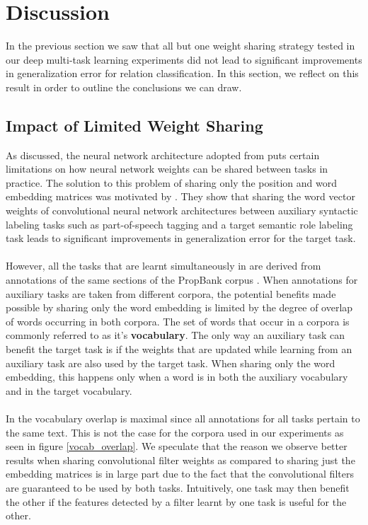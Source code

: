 \chapter{Discussion}
In the previous section we saw that all but one weight sharing strategy tested in our deep multi-task learning experiments did not lead to significant improvements in generalization error for relation classification. In this section, we reflect on this result in order to outline the conclusions we can draw.

\section{Impact of Limited Weight Sharing}
As discussed, the neural network architecture adopted from \citet{nguyen2015} puts certain limitations on how neural network weights can be shared between tasks in practice. The solution to this problem of sharing only the position and word embedding matrices was motivated by \citet{collobert2008}. They show that sharing the word vector weights of convolutional neural network architectures between auxiliary syntactic labeling tasks such as part-of-speech tagging and a target semantic role labeling task leads to significant improvements in generalization error for the target task.
\\\\
However, all the tasks that are learnt simultaneously in \citet{collobert2008} are derived from annotations of the same sections of the PropBank corpus \citep{kingsbury2002}. When annotations for auxiliary tasks are taken from different corpora, the potential benefits made possible by sharing only the word embedding is limited by the degree of overlap of words occurring in both corpora. The set of words that occur in a corpora is commonly referred to as it's \textbf{vocabulary}. The only way an auxiliary task can benefit the target task is if the weights that are updated while learning from an auxiliary task are also used by the target task. When sharing only the word embedding, this happens only when a word is in both the auxiliary vocabulary and in the target vocabulary.
\\\\
In \citet{collobert2008} the vocabulary overlap is maximal since all annotations for all tasks pertain to the same text. This is not the case for the corpora used in our experiments as seen in figure \ref{vocab_overlap}. We speculate that the reason we observe better results when sharing convolutional filter weights as compared to sharing just the embedding matrices is in large part due to the fact that the convolutional filters are guaranteed to be used by both tasks. Intuitively, one task may then benefit the other if the features detected by a filter learnt by one task is useful for the other.
